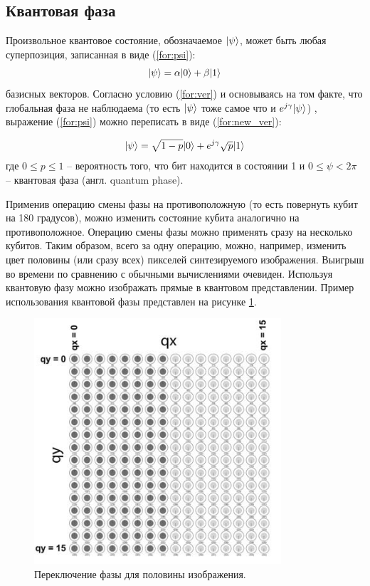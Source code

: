 \subsection{Квантовая фаза}

Произвольное квантовое состояние, обозначаемое $\lvert\psi\rangle$, может быть любая суперпозиция, записанная в виде (\ref{for:psi}):
\begin{equation}
	\label{for:psi}
	\lvert\psi\rangle = \alpha\lvert0\rangle + \beta\lvert1\rangle
\end{equation}
 базисных векторов. Согласно условию (\ref{for:ver}) и основываясь на том факте, что глобальная фаза не наблюдаема (то есть $\lvert\psi\rangle$ тоже самое что и $e^{j\gamma}\lvert\psi\rangle$) \cite{global-phase}, выражение (\ref{for:psi}) можно переписать в виде (\ref{for:new_ver}):
 
\begin{equation} 
	\label{for:new_ver}
	\lvert\psi\rangle = \sqrt{1 - p}\lvert0\rangle + e^{j\gamma}\sqrt{p}\lvert1\rangle
\end{equation} где $0 \leq p \leq 1$ -- вероятность того, что бит находится в состоянии 1 и $0 \leq \psi < 2\pi$ -- квантовая фаза (англ. quantum phase).

Применив операцию смены фазы на противоположную (то есть повернуть кубит на 180 градусов), можно изменить состояние кубита аналогично на противоположное. Операцию смены фазы можно применять сразу на несколько кубитов. Таким образом, всего за одну операцию, можно, например, изменить цвет половины (или сразу всех) пикселей синтезируемого изображения. Выигрыш во времени по сравнению с обычными вычислениями очевиден. Используя квантовую фазу можно изображать прямые в квантовом представлении. Пример использования квантовой фазы представлен на рисунке \ref{img:holst_02}.

\begin{figure}[h]
	\begin{center}
		\includegraphics[scale=0.7]{img/holst_02.png}
	\end{center}
	\captionsetup{justification=centering}
	\caption{Переключение фазы для половины изображения.}
	\label{img:holst_02}
\end{figure}

